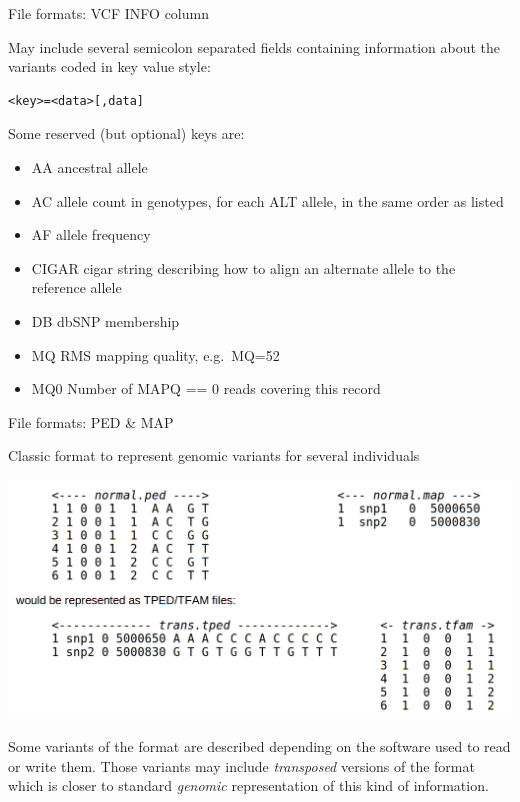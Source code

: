 \begin{frame}[fragile]{File formats: VCF INFO column}

May include several semicolon separated fields containing information
about the variants coded in key value style:

\begin{verbatim}
<key>=<data>[,data]
\end{verbatim}

Some reserved (but optional) keys are:

\begin{itemize}
\itemsep1pt\parskip0pt
\item
  AA ancestral allele
\item
  AC allele count in genotypes, for each ALT allele, in the same order
  as listed
\item
  AF allele frequency
\item
  CIGAR cigar string describing how to align an alternate allele to the
  reference allele
\item
  DB dbSNP membership
\item
  MQ RMS mapping quality, e.g.~MQ=52
\item
  MQ0 Number of MAPQ == 0 reads covering this record
\end{itemize}

\end{frame}

\begin{frame}{File formats: PED \& MAP}

Classic format to represent genomic variants for several individuals

\centerline{\includegraphics[scale=0.3]{images/ped-map.png}}

\small

Some variants of the format are described depending on the software used
to read or write them. Those variants may include \emph{transposed}
versions of the format which is closer to standard \emph{genomic}
representation of this kind of information.

\end{frame}

